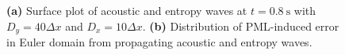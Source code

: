 \begin{figure}[h]
    \centering
    \begin{subfigure}[h]{0.45\textwidth}
        \centering
        \caption{}
        \label{fig:ncError}
    \end{subfigure}
    \hfill
    \begin{subfigure}[h]{0.45\textwidth}
        \centering
        \caption{}
        \label{fig:ncErrorDistr}
    \end{subfigure}
    \caption{\textbf{(a)} Surface plot of acoustic and entropy waves at $t=0.8 \ \mathrm{s}$ with $D_y=40\Delta x$ and $D_x=10\Delta x$. \textbf{(b)} Distribution of PML-induced error in Euler domain from propagating acoustic and entropy waves.}
    \label{fig:nc}
\end{figure}



